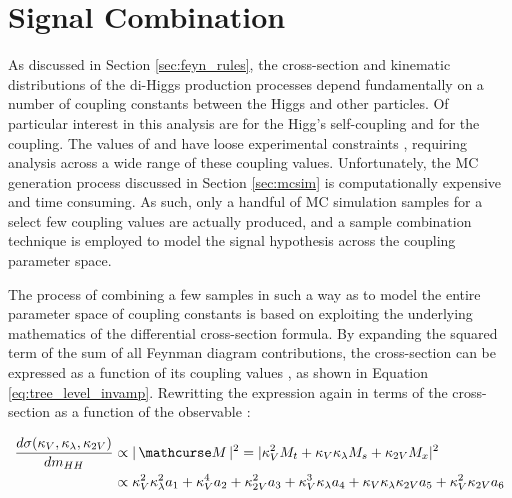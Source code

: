 \section{Signal Combination}

    As discussed in Section \ref{sec:feyn_rules},
        the cross-section and kinematic distributions of the di-Higgs production processes
        depend fundamentally on a number of coupling constants between the Higgs and other particles.
    Of particular interest in this analysis are \kl for the Higg's self-coupling and \kvv for the \HHVV coupling.
    The values of \kl and \kvv have loose experimental constraints \cite{EXOT-2016-31} \cite{HDBS-2018-18-witherratum} \cite{ATLAS-CONF-2019-049},
        requiring analysis across a wide range of these coupling values.
    Unfortunately, the MC generation process discussed in Section \ref{sec:mcsim} is computationally expensive and time consuming.
    As such, only a handful of MC simulation samples for a select few coupling values are actually produced,
        and a sample combination technique is employed to model the signal hypothesis across the coupling parameter space.

    The process of combining a few samples in such a way as to model the entire parameter space of coupling constants is based on exploiting the underlying mathematics of the differential cross-section formula.
    By expanding the squared term of the sum of all Feynman diagram contributions,
        the cross-section can be expressed as a function of its coupling values \cite{ATLAS-CONF-2019-049}, as shown in Equation \ref{eq:tree_level_invamp}.
    Rewritting the expression again in terms of the cross-section as a function of the observable \mhh:

    \begin{equation} \begin{split} \label{eq:tree_level_invamp_simple}
        \dXsecM &\propto |\invAmp|^2 = |  \kv^2 M_t + \kv \kl M_s + \kvv M_x |^2 \\
        &\propto \kv^2 \kl^2 a_1 + \kv^4 a_2 + \kvv^2 a_3 + \kv^3 \kl a_4 + \kv \kl \kvv a_5 + \kv^2 \kvv a_6
    \end{split} \end{equation}

